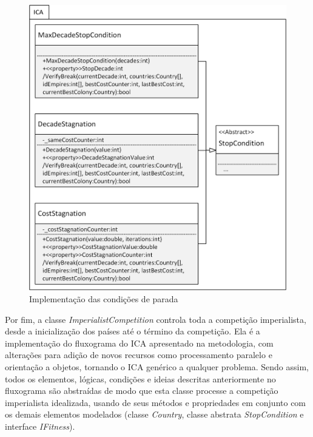 \begin{figure}[h]
	\centering	
	\includegraphics[scale=1]{Figuras/ClassesICA-StopConditionsImplements.png}
	\caption{Implementação das condições de parada}
	\label{fig:ClassesICA-StopConditionsImplements}
	\end{figure}

Por fim, a classe \emph{ImperialistCompetition} controla toda a competição imperialista, desde a inicialização dos países até o término da competição. Ela é a implementação do fluxograma do ICA apresentado na metodologia, com alterações para adição de novos recursos como processamento paralelo e orientação a objetos, tornando o ICA genérico a qualquer problema. Sendo assim, todos os elementos, lógicas, condições e ideias descritas anteriormente no fluxograma são abstraídas de modo que esta classe processe a competição imperialista idealizada, usando de seus métodos e propriedades em conjunto com os demais elementos modelados (classe \emph{Country}, classe abstrata \emph{StopCondition} e interface \emph{IFitness}).

